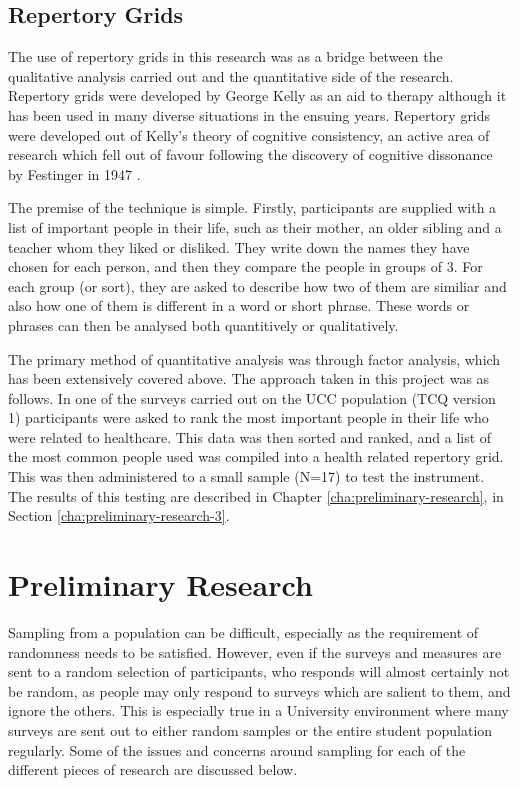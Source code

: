 \subsection{Repertory Grids}

The use of repertory grids in this research was as a bridge between the qualitative analysis carried out and the quantitative side of the research. Repertory grids were developed by George Kelly as an aid to therapy \cite{kelly2003psychology} although it has been used in many diverse situations in the ensuing years. Repertory grids were developed out of Kelly's theory of cognitive consistency, an active area of research which fell out of favour following the discovery of cognitive dissonance by Festinger in 1947 \cite{greenwald2002}.

The premise of the technique is simple. Firstly, participants are supplied with a list of important people in their life, such as their mother, an older sibling and a teacher whom they liked or disliked. They write down the names they have chosen for each person, and then they compare the people in groups of 3. For each group (or sort), they are asked to describe how two of them are similiar and also how one of them is different in a word or short phrase. These words or phrases can then be analysed both quantitively or qualitatively.

The primary method of quantitative analysis was through factor analysis, which has been extensively covered above. The approach taken in this project was as follows. In one of the surveys carried out on the UCC population (TCQ version 1) participants were asked to rank the most important people in their life who were related to healthcare. This data was then sorted and ranked, and a list of the most common people used was compiled into a health related repertory grid. This was then administered to a small sample (N=17) to test the instrument. The results of this testing are described in Chapter \ref{cha:preliminary-research}, in Section \ref{cha:preliminary-research-3}.

\section{Preliminary Research}

 Sampling from a population can be difficult, especially as the requirement of randomness needs to be satisfied. However, even if the surveys and measures are sent to a random selection of participants, who responds will almost certainly not be random, as people may only respond to surveys which are salient to them, and ignore the others. This is especially true in a University environment where many surveys are sent out to either random samples or the entire student population regularly. Some of the issues and concerns around sampling for each of the different pieces of research are discussed below.

